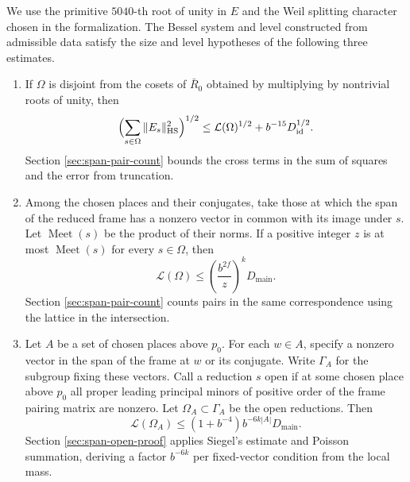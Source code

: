 We use the primitive \(5040\)-th root of unity in \(E\) and the Weil splitting
character chosen in the formalization. The Bessel system and level constructed
from admissible data satisfy the size and level hypotheses of the following
three estimates.

\begin{enumerate}
\item
If \(\Omega\) is disjoint from the cosets of \(\bar R_0\) obtained by
multiplying by nontrivial roots of unity, then
\begin{equation}\label{eq:span-cutoff}
 \Bigl(\sum_{s\in\Omega}\|E_s\|_{\mathrm{HS}}^2\Bigr)^{1/2}
 \leq \mathcal L(\Omega)^{1/2}+b^{-15}D_{\mathrm{id}}^{1/2}.
\end{equation}
Section \ref{sec:span-pair-count} bounds the cross terms in the sum of squares
and the error from truncation.
\item
Among the chosen places and their conjugates, take those at which the
span of the reduced frame has a nonzero vector in common with its image
under \(s\). Let \(\operatorname{Meet}(s)\) be the product of their norms.
If a positive integer \(z\) is at most \(\operatorname{Meet}(s)\) for every
\(s\in\Omega\), then
\begin{equation}\label{eq:span-intersect}
 \mathcal L(\Omega)\leq
       \left(\frac{b^{2f}}z\right)^k D_{\mathrm{main}}.
\end{equation}
Section \ref{sec:span-pair-count} counts pairs in the same correspondence
using the lattice in the intersection.
\item
Let \(A\) be a set of chosen places above \(p_0\). For each \(w\in A\),
specify a nonzero vector in the span of the frame at \(w\) or its conjugate.
Write \(\Gamma_A\) for the subgroup fixing these vectors.
Call a reduction \(s\) open if at some chosen place above \(p_0\) all
proper leading principal minors of positive order of the frame pairing
matrix are nonzero. Let \(\Omega_A\subset\Gamma_A\) be the open reductions.
Then
\begin{equation}\label{eq:span-open-input}
 \mathcal L(\Omega_A)\leq (1+b^{-4})b^{-6k|A|}D_{\mathrm{main}}.
\end{equation}
Section \ref{sec:span-open-proof} applies Siegel's estimate and Poisson
summation, deriving a factor \(b^{-6k}\) per fixed-vector condition from
the local mass.
\end{enumerate}

